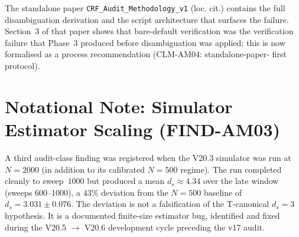 \documentclass[12pt, a4paper]{article}
\begin{document}
The standalone paper \texttt{CRF\_Audit\_Methodology\_v1}
(loc. cit.) contains the full disambiguation derivation and the
script architecture that surfaces the failure. Section~3 of that paper
shows that bare-default verification was the verification failure that
Phase~3 produced before disambiguation was applied; this is now
formalised as a process recommendation (CLM-AM04: standalone-paper-
first protocol).

\section{Notational Note: Simulator Estimator Scaling (FIND-AM03)}

A third audit-class finding was registered when the V20.3 simulator
was run at $N=2000$ (in addition to its calibrated $N=500$ regime).
The run completed cleanly to sweep~$1000$ but produced a mean
$d_s \approx 4.34$ over the late window (sweeps 600--1000), a $43\%$
deviation from the $N=500$ baseline of $d_s = 3.031 \pm 0.076$. The
deviation is not a falsification of the T-canonical $d_s = 3$
hypothesis. It is a documented finite-size estimator bug, identified
and fixed during the V20.5 $\to$ V20.6 development cycle preceding
the v17 audit.
\end{document}

